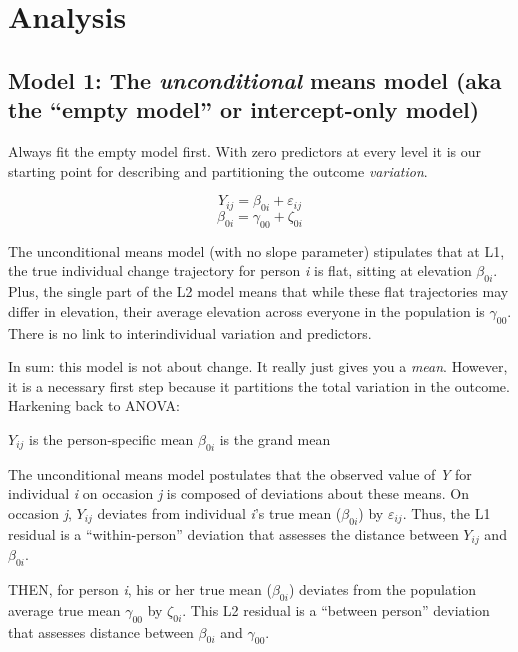 \documentclass[
  english,
]{book}
\begin{document}
\hypertarget{analysis}{%
\section{Analysis}\label{analysis}}

\hypertarget{model-1-the-unconditional-means-model-aka-the-empty-model-or-intercept-only-model}{%
\subsection{\texorpdfstring{Model 1: The \emph{unconditional} means model (aka the ``empty model'' or intercept-only model)}{Model 1: The unconditional means model (aka the ``empty model'' or intercept-only model)}}\label{model-1-the-unconditional-means-model-aka-the-empty-model-or-intercept-only-model}}

Always fit the empty model first. With zero predictors at every level it is our starting point for describing and partitioning the outcome \emph{variation}.

\[Y_{ij}=\beta _{0i}+\varepsilon _{ij}\]
\[\beta _{0i}=\gamma _{00}+\zeta _{0i}\]

The unconditional means model (with no slope parameter) stipulates that at L1, the true individual change trajectory for person \emph{i} is flat, sitting at elevation \(\beta _{0i}\). Plus, the single part of the L2 model means that while these flat trajectories may differ in elevation, their average elevation across everyone in the population is \(\gamma _{00}\). There is no link to interindividual variation and predictors.

In sum: this model is not about change. It really just gives you a \emph{mean}. However, it is a necessary first step because it partitions the total variation in the outcome. Harkening back to ANOVA:

\(Y_{ij}\) is the person-specific mean
\(\beta _{0i}\) is the grand mean

The unconditional means model postulates that the observed value of \emph{Y} for individual \emph{i} on occasion \emph{j} is composed of deviations about these means. On occasion \emph{j}, \(Y_{ij}\) deviates from individual \emph{i}'s true mean (\(\beta _{0i}\)) by \(\varepsilon _{ij}\). Thus, the L1 residual is a ``within-person'' deviation that assesses the distance between \(Y_{ij}\) and\(\beta _{0i}\).

THEN, for person \emph{i}, his or her true mean (\(\beta _{0i}\)) deviates from the population average true mean \(\gamma _{00}\) by \(\zeta _{0i}\). This L2 residual is a ``between person'' deviation that assesses distance between \(\beta _{0i}\) and \(\gamma _{00}\).
\end{document}
